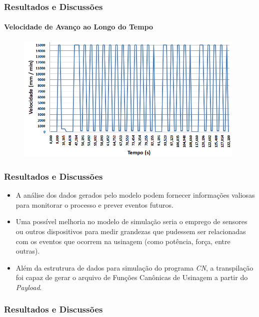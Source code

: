 \documentclass[aspectratio=169]{beamer}
\begin{document}
{\begin{frame}[fragile]
\end{frame}


\begin{frame}[fragile]
  \frametitle{Resultados e Discussões}
  \framesubtitle{Velocidade de Avanço ao Longo do Tempo}

  \begin{figure}[H]
    \centering
    \includegraphics[width=110mm]{images/feed-values-graph.png}
  \end{figure}

\end{frame}


\begin{frame}[fragile]
  \frametitle{Resultados e Discussões}

  \begin{itemize}
    \item A análise dos dados gerados pelo modelo podem fornecer 
          informações valiosas para monitorar o processo e prever 
          eventos futuros.
    \item Uma possível melhoria no modelo de simulação seria o 
          emprego de sensores ou outros dispositivos para medir grandezas
          que pudessem ser relacionadas com os eventos que ocorrem na 
          usinagem (como potência, força, entre outras).
    \item Além da estrutrura de dados para simulação do programa 
          \emph{CN}, a transpilação foi capaz de gerar o arquivo de 
          Funções Canônicas de Usinagem a partir do \emph{Payload}.
  \end{itemize}

\end{frame}


\begin{frame}[fragile]
  \frametitle{Resultados e Discussões}

  \begin{tabular}{ |l|l| }


\end{tabular}
\end{frame}}
\end{document}
